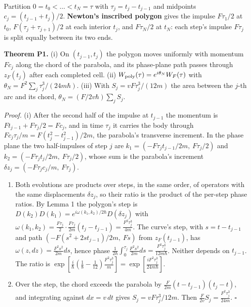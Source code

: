 \documentclass[11pt,a4paper]{article}
\begin{document}
Partition \(0=t_0<\dots<t_N=\tau\) with \(\tau_j=t_j-t_{j-1}\) and
midpoints \(c_j=(t_{j-1}+t_j)/2\). \textbf{Newton's inscribed polygon}
gives the impulse \(F\tau_1/2\) at \(t_0\), \(F(\tau_j+\tau_{j+1})/2\)
at each interior \(t_j\), and \(F\tau_N/2\) at \(t_N\): each step's
impulse \(F\tau_j\) is split equally between its two ends.

\textbf{Theorem P1.} (i) On \((t_{j-1},t_j)\) the polygon moves
uniformly with momentum \(Fc_j\) along the chord of the parabola, and
its phase-plane path passes through \(z_F(t_j)\) after each completed
cell. (ii) \(W_{\rm poly}(\tau)=e^{i\theta_N}W_F(\tau)\) with
\(\theta_N=F^2\sum_j\tau_j^3/(24m\hbar)\). (iii) With
\(S_j=vF\tau_j^3/(12m)\) the area between the \(j\)-th arc and its
chord, \(\theta_N=(F/2v\hbar)\sum_jS_j\).

\emph{Proof.} (i) After the second half of the impulse at \(t_{j-1}\)
the momentum is \(Ft_{j-1}+F\tau_j/2=Fc_j\), and in time \(\tau_j\) it
carries the body through \(Fc_j\tau_j/m=F(t_j^2-t_{j-1}^2)/2m\), the
parabola's transverse increment. In the phase plane the two
half-impulses of step \(j\) are \(k_1=(-F\tau_jt_{j-1}/2m,\ F\tau_j/2)\)
and \(k_2=(-F\tau_jt_j/2m,\ F\tau_j/2)\), whose sum is the parabola's
increment \(\delta z_j=(-F\tau_jc_j/m,\ F\tau_j)\).

\begin{enumerate}
\def\labelenumi{(\roman{enumi})}
\setcounter{enumi}{1}
\item
  Both evolutions are products over steps, in the same order, of
  operators with the same displacements \(\delta z_j\), so their ratio
  is the product of the per-step phase ratios. By Lemma 1 the polygon's
  step is \(D(k_2)D(k_1)=e^{i\omega(k_1,k_2)/2\hbar}D(\delta z_j)\) with
  \(\omega(k_1,k_2)=\frac{F\tau_j}{2}\cdot\frac{F\tau_j}{2m}(t_j-t_{j-1})=\frac{F^2\tau_j^3}{4m}\).
  The curve's step, with \(s=t-t_{j-1}\) and path
  \((-F(s^2+2st_{j-1})/2m,\ Fs)\) from \(z_F(t_{j-1})\), has
  \(\omega(z,dz)=\frac{F^2s^2}{2m}ds\), hence phase
  \(\frac1{2\hbar}\int_0^{\tau_j}\frac{F^2s^2}{2m}ds=\frac{F^2\tau_j^3}{12m\hbar}\).
  Neither depends on \(t_{j-1}\). The ratio is
  \(\exp[\frac{i}{\hbar}(\frac18-\frac1{12})\frac{F^2\tau_j^3}{m}]=\exp[\frac{iF^2\tau_j^3}{24m\hbar}]\).
\item
  Over the step, the chord exceeds the parabola by
  \(\frac{F}{2m}(t-t_{j-1})(t_j-t)\), and integrating against
  \(dx=v\,dt\) gives \(S_j=vF\tau_j^3/12m\). Then
  \(\frac{F}{2v}S_j=\frac{F^2\tau_j^3}{24m}\). \(\square\)
\end{enumerate}
\end{document}
